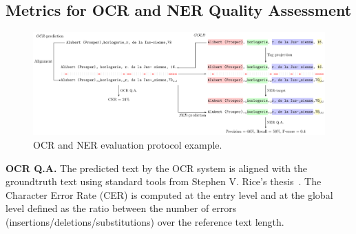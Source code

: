 
%
%
%






\subsection{Metrics for OCR and NER Quality Assessment}

\begin{figure}[tb]
    \includegraphics[width=\linewidth]{figs/eval-ocr-ner.pdf}
    \caption{OCR and NER evaluation protocol example.}
    \label{fig.eval-ocr-ner}
\end{figure}

\textbf{OCR Q.A.}  The predicted text by the OCR system is aligned with the groundtruth text using standard tools from
Stephen V. Rice's thesis~\cite{santos.2019.wcmel,neudecker.2021.whdip}. The Character Error Rate (CER) is computed at
the entry level and at the global level defined as the ratio between the number of errors
(insertions/deletions/substitutions) over the reference text length. 

